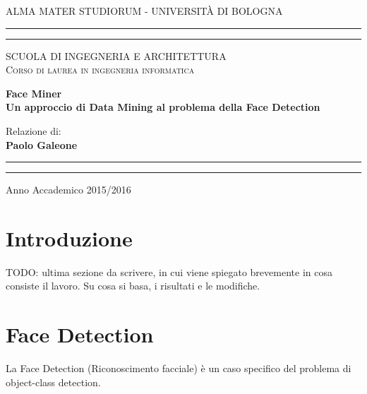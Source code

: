 \sloppy
\setlength{\parindent}{0pt}



\begin{titlepage}
    \begin{center}
        {{\large{\textsc{ALMA MATER STUDIORUM - UNIVERSITÀ DI BOLOGNA}}}}
        \rule[0.1cm]{14cm}{0.1mm}
        \rule[0.5cm]{14cm}{0.6mm}
        {\textsc { SCUOLA DI INGEGNERIA E ARCHITETTURA } }\\
        {\small{\textsc { Corso di laurea in ingegneria informatica}}}
    \end{center}
    \vspace*{\fill}
    \begin{center}
        {\Large\textbf{Face Miner\\[1\baselineskip]
        Un approccio di Data Mining al problema della Face Detection}} \\
    \end{center}
    \vspace*{\fill}
    \par
    \noindent
    \begin{minipage}[t]{0.47\textwidth}
        {\large{Relazione di:}\\[1\baselineskip]
        {\bf Paolo Galeone}}
    \end{minipage}
    \hfill
    \vspace{20mm}
    \begin{center}
        \rule[0.1cm]{14cm}{0.1mm}
        \rule[0.5cm]{14cm}{0.6mm}
        Anno Accademico 2015/2016\\
    \end{center}
\end{titlepage}
\clearpage
\tableofcontents
\clearpage

\section{Introduzione}

TODO: ultima sezione da scrivere, in cui viene spiegato brevemente in cosa consiste il lavoro. Su cosa si basa, i risultati e le modifiche.
\clearpage
\section{Face Detection}
La Face Detection (Riconoscimento facciale) è un caso specifico del problema di object-class detection.

